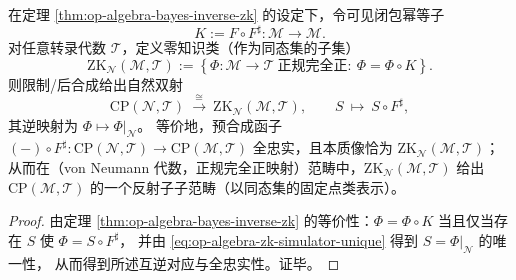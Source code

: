 \begin{corollary}[贝叶斯逆诱导的零知识信道反射子与范畴同构]\label{cor:op-algebra-zk-reflector-bayes}
在定理 \ref{thm:op-algebra-bayes-inverse-zk} 的设定下，令可见闭包幂等子
\[
K:=F\circ F^\sharp:\mathcal{M}\to\mathcal{M}.
\]
对任意转录代数 \(\mathcal{T}\)，定义零知识类（作为同态集的子集）
\[
\mathrm{ZK}_{\mathcal{N}}(\mathcal{M},\mathcal{T})
:=\left\{\Phi:\mathcal{M}\to\mathcal{T}\ \text{正规完全正}:\ \Phi=\Phi\circ K\right\}.
\]
则限制/后合成给出自然双射
\[
\mathrm{CP}(\mathcal{N},\mathcal{T})\ \xrightarrow{\ \cong\ }\ \mathrm{ZK}_{\mathcal{N}}(\mathcal{M},\mathcal{T}),
\qquad
S\ \longmapsto\ S\circ F^\sharp,
\]
其逆映射为 \(\Phi\mapsto \Phi|_{\mathcal{N}}\)。
等价地，预合成函子 \((-) \circ F^\sharp:\mathrm{CP}(\mathcal{N},\mathcal{T})\to \mathrm{CP}(\mathcal{M},\mathcal{T})\) 全忠实，且本质像恰为 \(\mathrm{ZK}_{\mathcal{N}}(\mathcal{M},\mathcal{T})\)；
从而在（von Neumann 代数，正规完全正映射）范畴中，\(\mathrm{ZK}_{\mathcal{N}}(\mathcal{M},\mathcal{T})\) 给出 \(\mathrm{CP}(\mathcal{M},\mathcal{T})\) 的一个反射子子范畴（以同态集的固定点类表示）。
\end{corollary}
\begin{proof}
由定理 \ref{thm:op-algebra-bayes-inverse-zk} 的等价性：\(\Phi=\Phi\circ K\) 当且仅当存在 \(S\) 使 \(\Phi=S\circ F^\sharp\)，
并由 \eqref{eq:op-algebra-zk-simulator-unique} 得到 \(S=\Phi|_{\mathcal{N}}\) 的唯一性，
从而得到所述互逆对应与全忠实性。证毕。
\end{proof}

